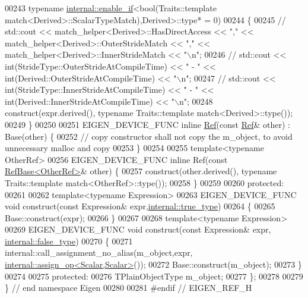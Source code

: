 \begin{DoxyCode}
00243                                  \textcolor{keyword}{typename} \hyperlink{struct_eigen_1_1internal_1_1enable__if}{internal::enable\_if}<\textcolor{keywordtype}{bool}(Traits::template 
      match<Derived>::ScalarTypeMatch),Derived>::type* = 0)
00244     \{
00245 \textcolor{comment}{//      std::cout << match\_helper<Derived>::HasDirectAccess << "," <<
       match\_helper<Derived>::OuterStrideMatch << "," << match\_helper<Derived>::InnerStrideMatch << "\(\backslash\)n";}
00246 \textcolor{comment}{//      std::cout << int(StrideType::OuterStrideAtCompileTime) << " - " <<
       int(Derived::OuterStrideAtCompileTime) << "\(\backslash\)n";}
00247 \textcolor{comment}{//      std::cout << int(StrideType::InnerStrideAtCompileTime) << " - " <<
       int(Derived::InnerStrideAtCompileTime) << "\(\backslash\)n";}
00248       construct(expr.derived(), \textcolor{keyword}{typename} Traits::template match<Derived>::type());
00249     \}
00250 
00251     EIGEN\_DEVICE\_FUNC \textcolor{keyword}{inline} \hyperlink{group___core___module_class_eigen_1_1_ref}{Ref}(\textcolor{keyword}{const} \hyperlink{group___core___module_class_eigen_1_1_ref}{Ref}& other) : Base(other) \{
00252       \textcolor{comment}{// copy constructor shall not copy the m\_object, to avoid unnecessary malloc and copy}
00253     \}
00254 
00255     \textcolor{keyword}{template}<\textcolor{keyword}{typename} OtherRef>
00256     EIGEN\_DEVICE\_FUNC \textcolor{keyword}{inline} Ref(\textcolor{keyword}{const} \hyperlink{class_eigen_1_1_ref_base}{RefBase<OtherRef>}& other) \{
00257       construct(other.derived(), \textcolor{keyword}{typename} Traits::template match<OtherRef>::type());
00258     \}
00259 
00260   \textcolor{keyword}{protected}:
00261 
00262     \textcolor{keyword}{template}<\textcolor{keyword}{typename} Expression>
00263     EIGEN\_DEVICE\_FUNC \textcolor{keywordtype}{void} construct(\textcolor{keyword}{const} Expression& expr,\hyperlink{struct_eigen_1_1internal_1_1true__type}{internal::true\_type})
00264     \{
00265       Base::construct(expr);
00266     \}
00267 
00268     \textcolor{keyword}{template}<\textcolor{keyword}{typename} Expression>
00269     EIGEN\_DEVICE\_FUNC \textcolor{keywordtype}{void} construct(\textcolor{keyword}{const} Expression& expr, 
      \hyperlink{struct_eigen_1_1internal_1_1false__type}{internal::false\_type})
00270     \{
00271       internal::call\_assignment\_no\_alias(m\_object,expr,
      \hyperlink{struct_eigen_1_1internal_1_1assign__op}{internal::assign\_op<Scalar,Scalar>}());
00272       Base::construct(m\_object);
00273     \}
00274 
00275   \textcolor{keyword}{protected}:
00276     TPlainObjectType m\_object;
00277 \};
00278 
00279 \} \textcolor{comment}{// end namespace Eigen}
00280 
00281 \textcolor{preprocessor}{#endif // EIGEN\_REF\_H}
\end{DoxyCode}
